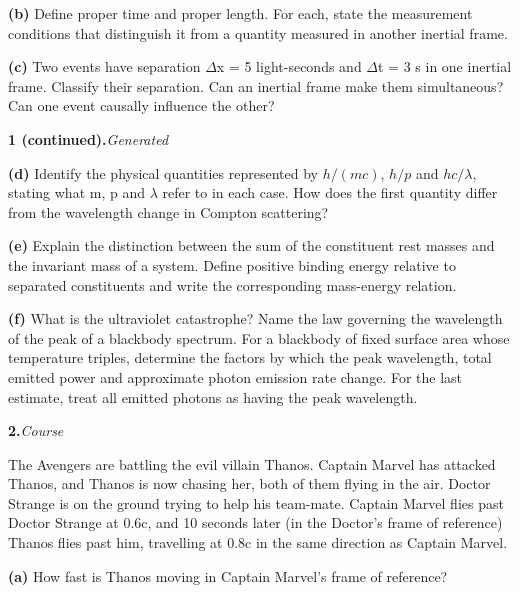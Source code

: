 \documentclass[12pt,letterpaper]{article}
\newcommand{\question}[2]{\noindent\textbf{#1.}\hfill\textit{#2}\par\medskip}
\begin{document}
\vfill

\textbf{(b)} Define proper time and proper length. For each, state the measurement conditions that distinguish it from a quantity measured in another inertial frame.


\vfill

\textbf{(c)} Two events have separation \ensuremath{\Delta}x = 5 light-seconds and \ensuremath{\Delta}t = 3 s in one inertial frame. Classify their separation. Can an inertial frame make them simultaneous? Can one event causally influence the other?


\vfill

\newpage

\question{1 (continued)}{Generated}

\textbf{(d)} Identify the physical quantities represented by \(h/(mc)\), \(h/p\) and \(hc/\lambda\), stating what m, p and \ensuremath{\lambda} refer to in each case. How does the first quantity differ from the wavelength change in Compton scattering?


\vfill

\textbf{(e)} Explain the distinction between the sum of the constituent rest masses and the invariant mass of a system. Define positive binding energy relative to separated constituents and write the corresponding mass-energy relation.


\vfill

\textbf{(f)} What is the ultraviolet catastrophe? Name the law governing the wavelength of the peak of a blackbody spectrum. For a blackbody of fixed surface area whose temperature triples, determine the factors by which the peak wavelength, total emitted power and approximate photon emission rate change. For the last estimate, treat all emitted photons as having the peak wavelength.


\vfill

\newpage

\question{2}{Course}

The Avengers are battling the evil villain Thanos. Captain Marvel has attacked Thanos, and Thanos is now chasing her, both of them flying in the air. Doctor Strange is on the ground trying to help his team-mate. Captain Marvel flies past Doctor Strange at 0.6c, and 10 seconds later (in the Doctor's frame of reference) Thanos flies past him, travelling at 0.8c in the same direction as Captain Marvel.


\textbf{(a)} How fast is Thanos moving in Captain Marvel's frame of reference?


\vfill
\end{document}
